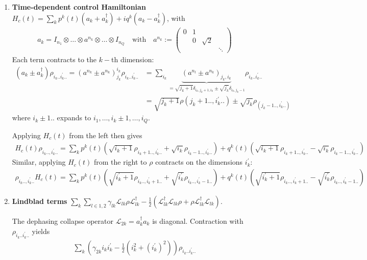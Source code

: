 \documentclass[letterpaper]{article}
\newcommand{\Ell}{\mathcal{L}}
\begin{document}
\begin{enumerate}
    \item \textbf{Time-dependent control Hamiltonian} $H_c(t) = \sum_k p^k(t) (a_k + a_k^\dag) + iq^k(a_k - a_k^\dag)$, with  
      \begin{align}
      a_k = I_{n_1}\otimes \dots \otimes a^{n_k} \otimes \dots \otimes I_{n_Q} \quad \text{with} \quad a^{n_k} := \begin{pmatrix} 0 & 1 & \\ & 0 & \sqrt{2} \\ & & & \ddots \end{pmatrix}
      \end{align}
      Each term contracts to the $k-$th dimension:
      \begin{align}
        (a_k\pm a_k^\dag) \rho_{i_k..i_k^\prime ..} = (a^{n_k} \pm a^{n_k})^{i_k}_{j_k} \rho_{i_k..i_k^\prime..} &= \sum_{i_k} \underbrace{(a^{n_l} \pm a^{n_k})_{j_k,i_k}}_{= \sqrt{j_k+1} \delta_{i_k,j_k+1,i_{k}} \pm \sqrt{j_k} \delta_{i_k,j_k-1}} \rho_{i_k.. i_k^{\prime}..} \\
        &= \sqrt{j_k+1} \rho(j_k+1.., i_k^\prime..) \pm \sqrt{j_k} \rho_(j_k-1.., i_k^\prime..)
      \end{align} 
      where $i_k\pm1..$ expands to $i_1,\dots,i_k\pm 1,\dots,i_Q$.

      Applying $H_c(t)$ from the left then gives 
      \begin{align}
        H_c(t) \rho_{i_k.., i_k^\prime ..} = \sum_k p^k(t) \left(\sqrt{i_k+1} \rho_{i_k+1..,i_k^\prime..} + \sqrt{i_k} \rho_{i_k-1..,i_k^\prime..} \right) + q^k(t) \left(\sqrt{i_k+1} \rho_{i_k+1..,i_k^\prime..} - \sqrt{i_k} \rho_{i_k-1..,i_k^\prime..} \right)
      \end{align}
      Similar, applying $H_c(t)$ from the right to $\rho$ contracts on the dimensions $i_k^\prime$:
      \begin{align}
        \rho_{i_k.., i_k^\prime ..} H_c(t) = \sum_k p^k(t) \left(\sqrt{i_k^\prime+1} \rho_{i_k..,i_k^\prime+1..} + \sqrt{i_k^\prime} \rho_{i_k..,i_k^\prime-1..} \right) + q^k(t) \left(\sqrt{i_k^\prime+1} \rho_{i_k..,i_k^\prime+1..} - \sqrt{i_k^\prime} \rho_{i_k..,i_k^\prime-1..} \right)
      \end{align}

    \item \textbf{Lindblad terms} $\sum_k \sum_{l\in{1,2}} \gamma_{lk} \Ell_{lk} \rho \Ell_{lk}^\dag - \frac{1}{2} \left( \Ell_{lk}^\dag \Ell_{lk} \rho + \rho \Ell_{lk}^\dag \Ell_{lk}\right)$.
    
    The dephasing collapse operator $\Ell_{2k} = a_k^\dag a_k$ is diagonal. Contraction with $\rho_{i_k..i_k^\prime..}$ yields
    \begin{align}
        \sum_k \left( \gamma_{2k} i_ki_k^\prime - \frac 12 \left( i_k^2 + (i_k^\prime)^2\right) \right) \rho_{i_k..i_k^\prime..}
    \end{align}


\end{enumerate}
\end{document}
